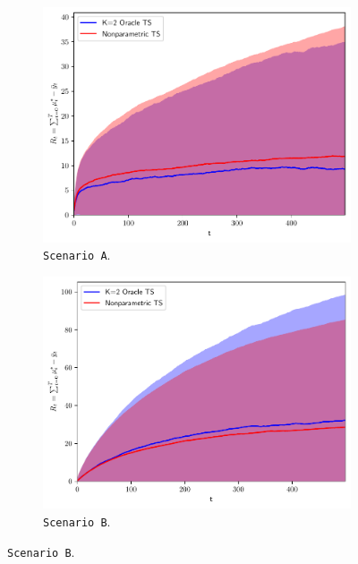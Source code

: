 \begin{figure}[!h]
	\centering
	\begin{subfigure}[c]{0.45\textwidth}
		\includegraphics[width=\textwidth]{./figs/linearGaussianMixture/easy/cumregret_R3742.pdf}
		\vspace*{-5ex}
		\caption{\texttt{Scenario A}.}
		\label{fig:scenario_A_oracle}
	\end{subfigure}
	\begin{subfigure}[c]{0.45\textwidth}
		\includegraphics[width=\textwidth]{./figs/linearGaussianMixture/hard/cumregret_R3629.pdf}
		\vspace*{-5ex}
		\caption{\texttt{Scenario B}.}
		\label{fig:scenario_B_oracle}
	\end{subfigure}
	

\end{figure}
